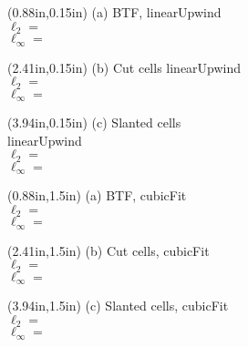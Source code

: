 \documentclass{article}
\begin{document}
\begin{textblock*}{12em}(0.88in,0.15in)
\footnotesize
(a) BTF, linearUpwind \\
\hspace*{0.2em}$\ell_2 = $ \\
\hspace*{0.2em}$\ell_\infty = $
\end{textblock*}
\begin{textblock*}{12em}(2.41in,0.15in)
\footnotesize
(b) Cut cells linearUpwind \\
\hspace*{0.2em}$\ell_2 = $ \\
\hspace*{0.2em}$\ell_\infty = $
\end{textblock*}
\begin{textblock*}{12em}(3.94in,0.15in)
\footnotesize
(c) Slanted cells \\
linearUpwind \\
\hspace*{0.2em}$\ell_2 = $ \\
\hspace*{0.2em}$\ell_\infty = $
\end{textblock*}
\begin{textblock*}{12em}(0.88in,1.5in)
\footnotesize
(a) BTF, cubicFit \\
\hspace*{0.2em}$\ell_2 = $ \\
\hspace*{0.2em}$\ell_\infty = $
\end{textblock*}
\begin{textblock*}{12em}(2.41in,1.5in)
\footnotesize
(b) Cut cells, cubicFit \\
\hspace*{0.2em}$\ell_2 = $ \\
\hspace*{0.2em}$\ell_\infty = $
\end{textblock*}
\begin{textblock*}{12em}(3.94in,1.5in)
\footnotesize
(c) Slanted cells, cubicFit \\
\hspace*{0.2em}$\ell_2 = $ \\
\hspace*{0.2em}$\ell_\infty = $
\end{textblock*}
\end{document}
